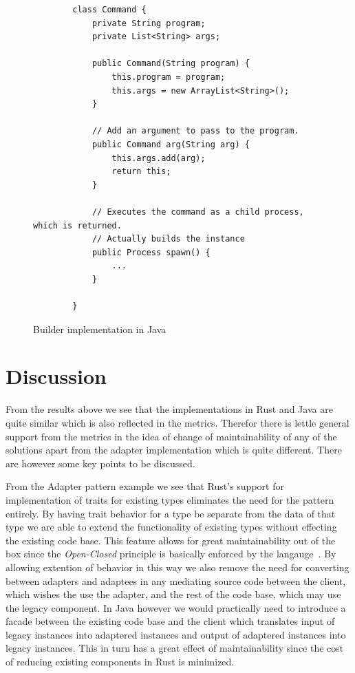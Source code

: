 \documentclass[conference]{IEEEtran}
\begin{document}
\begin{figure}[btp]
    \begin{verbatim}
        class Command {
            private String program;
            private List<String> args;

            public Command(String program) {
                this.program = program;
                this.args = new ArrayList<String>();
            }

            // Add an argument to pass to the program.
            public Command arg(String arg) {
                this.args.add(arg);
                return this;
            }

            // Executes the command as a child process, which is returned.
            // Actually builds the instance
            public Process spawn() {
                ...
            }

        }
    \end{verbatim}
    \caption{Builder implementation in Java}
    \label{fig:builder-java-impl}
\end{figure}

\section{Discussion}


From the results above we see that the implementations in Rust and Java are quite similar which is also reflected in the metrics. 
Therefor there is lettle general support from the metrics in the idea of change of maintainability of any of the solutions apart from the adapter implementation which is quite different.
There are however some key points to be discussed.

From the Adapter pattern example we see that Rust's support for implementation of traits for existing types eliminates the need for the pattern entirely.
By having trait behavior for a type be separate from the data of that type we are able to extend the functionality of existing types without effecting the existing code base.
This feature allows for great maintainability out of the box since the \emph{Open-Closed} principle is basically enforced by the langauge~\cite{gamma1993:gof}.
By allowing extention of behavior in this way we also remove the need for converting between adapters and adaptees in any mediating source code between the client, which wishes the use the adapter, and the rest of the code base, which may use the legacy component.
In Java however we would practically need to introduce a facade between the existing code base and the client which translates input of legacy instances into adaptered instances and output of adaptered instances into legacy instances.
This in turn has a great effect of maintainability since the cost of reducing existing components in Rust is minimized.
\end{document}
